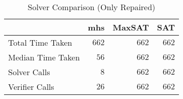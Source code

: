 \begin{table}[!h]
\caption{Solver Comparison (Only Repaired)}
\label{Ta:solver_comparison_repaired}
\begin{center}

\def\arraystretch{1.1}
\setlength\tabcolsep{7pt}

\begin{tabular}{|l|r|r|r|}
\hline

\multicolumn{1}{|c|}{} & \multicolumn{1}{|c|}{\textbf{mhs}} & \multicolumn{1}{|c|}{\textbf{MaxSAT}} & \multicolumn{1}{|c|}{\textbf{SAT}} \\ \hline \hline
Total Time Taken & $662$ & $662$ & $662$\\ \hline
Median Time Taken & $56$ & $662$ & $662$\\ \hline
Solver Calls & $8$ & $662$ & $662$\\ \hline
Verifier Calls & $26$ & $662$ & $662$\\ \hline

\end{tabular}

\end{center}
\end{table}
